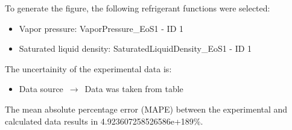 To generate the figure, the following refrigerant functions were selected:
\begin{itemize}
\item Vapor pressure: VaporPressure\_EoS1 - ID 1
\item Saturated liquid density: SaturatedLiquidDensity\_EoS1 - ID 1
\end{itemize}

The uncertainity of the experimental data is:
\begin{itemize}
\item Data source $\,\to\,$ Data was taken from table
\end{itemize}

The mean absolute percentage error (MAPE) between the experimental and calculated data results in 4.923607258526586e+189\%.
\FloatBarrier
\newpage
